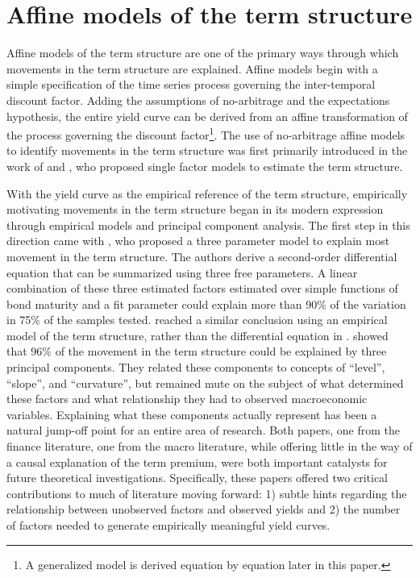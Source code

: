 \documentclass{article}
\numberwithin{equation}{section}
\begin{document}
\section{Affine models of the term structure}
\label{sec:affine}

Affine models of the term structure are one of the primary ways through which
movements in the term structure are explained. Affine models begin with
a simple specification of the time series process governing the inter-temporal
discount factor. Adding the assumptions of no-arbitrage and the expectations
hypothesis, the entire yield curve can be derived from an affine transformation
of the process governing the discount factor\footnote{A generalized model is
derived equation by equation later in this paper.}. The use of no-arbitrage
affine models to identify movements in the term structure was first primarily
introduced in the work of \citet{vasicek1977} and \citet{coxingersollross1985},
who proposed single factor models to estimate the term structure.

With the yield curve as the empirical reference of the term structure,
empirically motivating movements in the term structure began in its modern
expression through empirical models and principal component analysis. The first
step in this direction came with \citet{nelson1987}, who proposed a three
parameter model to explain most movement in the term structure. The authors
derive a second-order differential equation that can be summarized using three
free parameters.  A linear combination of these three estimated factors
estimated over simple functions of bond maturity and a fit parameter could
explain more than 90\% of the variation in 75\% of the samples tested.
\citet{litterman1991common} reached a similar conclusion using an empirical
model of the term structure, rather than the differential equation in
\citet{nelson1987}. \citet{litterman1991common} showed that 96\% of the
movement in the term structure could be explained by three principal
components. They related these components to concepts of ``level'', ``slope'',
and ``curvature'', but remained mute on the subject of what determined these
factors and what relationship they had to observed macroeconomic variables.
Explaining what these components actually represent has been a natural jump-off
point for an entire area of research. Both papers, one from the finance
literature, one from the macro literature, while offering little in the way of
a causal explanation of the term premium, were both important catalysts for
future theoretical investigations. Specifically, these papers offered two
critical contributions to much of literature moving forward: 1) subtle
hints regarding the relationship between unobserved factors and observed yields
and 2) the number of factors needed to generate empirically meaningful yield
curves.
\end{document}
